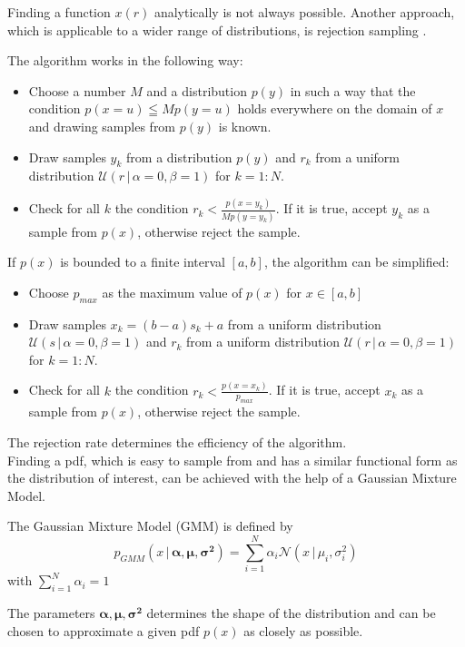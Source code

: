\documentclass{tstextbook}
\begin{document}
Finding a function $x(r)$ analytically is not always possible. Another approach, which is applicable to a wider range of distributions, is rejection sampling \cite{neumann1951}. 
\begin{definition}
  \label{th:rejectionsampling}
The algorithm works in the following way:
\begin{itemize}
\item
Choose a number $M$ and a distribution $p(y)$ in such a way that the condition $p(x=u)\leqq M p(y=u)$ holds everywhere on the domain of $x$ and drawing samples from $p(y)$ is known. 
\item 
Draw samples $y_k$ from a distribution $p(y)$ and $r_k$ from a uniform distribution $\mathcal{U}(r\,\vert\,\alpha=0,\beta=1)$ for $k=1:N$.
\item
Check for all $k$ the condition $r_k < \frac{p(x=y_k)}{M p(y=y_k)}$. If it is true, accept $y_k$ as a sample from $p(x)$, otherwise reject the sample.
\end{itemize}
\end{definition}
If $p(x)$ is bounded to a finite interval $[a,b]$, the algorithm can be simplified:
\begin{itemize}
\item
Choose $p_{max}$ as the maximum value of $p(x)$ for $x\in [a,b]$
\item 
Draw samples $x_k=(b-a)s_k+a$ from a uniform distribution $\mathcal{U}(s\,\vert\,\alpha=0,\beta=1)$ and $r_k$ from a uniform distribution $\mathcal{U}(r\,\vert\,\alpha=0,\beta=1)$ for $k=1:N$.
\item
Check for all $k$ the condition $r_k < \frac{p(x=x_k)}{p_{max}}$. If it is true, accept $x_k$ as a sample from $p(x)$, otherwise reject the sample.
\end{itemize}
The rejection rate determines the efficiency of the algorithm.\\ 

Finding a pdf, which is easy to sample from and has a similar functional form as the distribution of interest, can be achieved with the help of a Gaussian Mixture Model.

\begin{definition}
  \label{th:gaussianmixturemodel}
  The Gaussian Mixture Model (GMM) is defined by
  \begin{equation}
    p_{GMM}(x\,\vert\,\boldsymbol{\alpha},\boldsymbol{\mu},\boldsymbol{\sigma^2}) = \sum_{i=1}^N \alpha_i \mathcal{N}\left(x\,\vert\,\mu_i,\sigma_i^2\right)
  \end{equation}
  with $\sum_{i=1}^N \alpha_i=1$
\end{definition}
The parameters $\boldsymbol{\alpha},\boldsymbol{\mu},\boldsymbol{\sigma^2}$ determines the shape of the distribution and can be chosen to approximate a given pdf $p(x)$ as closely as possible.\\
\end{document}

